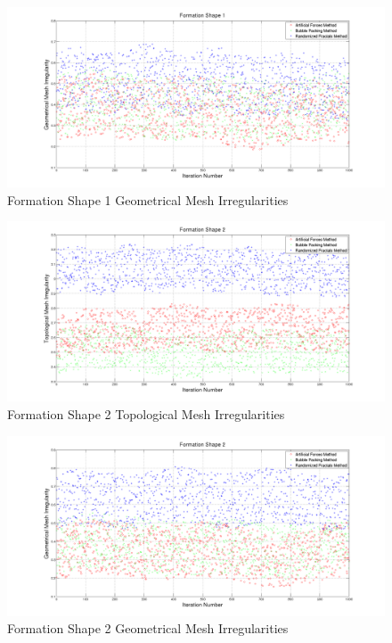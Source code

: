 \begin{figure}[H]
\caption{Formation Shape 1 Geometrical Mesh Irregularities} \label{geometric_ref_1}
\centerline{\includegraphics[scale = 0.32]{Geometrical_Irr_1}}
\end{figure} 	

\begin{figure}[H]
\caption{Formation Shape 2 Topological Mesh Irregularities} \label{topologic_ref_2}
\centerline{\includegraphics[scale = 0.32]{Topological_Irr_2}}
\end{figure} 	
				
\begin{figure}[H]
\caption{Formation Shape 2 Geometrical Mesh Irregularities} \label{geometric_ref_2}
\centerline{\includegraphics[scale = 0.32]{Geometrical_Irr_2}}
\end{figure} 	

